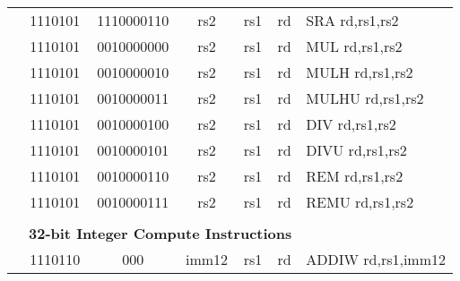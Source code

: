 \begin{table}[p]
\begin{small}
\begin{center}
\begin{tabular}{rcccccccccl}
&
\multicolumn{1}{|c|}{1110101} &
\multicolumn{5}{c|}{1110000110} &
\multicolumn{1}{c|}{rs2} &
\multicolumn{1}{c|}{rs1} &
\multicolumn{1}{c|}{rd} & SRA rd,rs1,rs2 \\
\cline{2-10}
  

&
\multicolumn{1}{|c|}{1110101} &
\multicolumn{5}{c|}{0010000000} &
\multicolumn{1}{c|}{rs2} &
\multicolumn{1}{c|}{rs1} &
\multicolumn{1}{c|}{rd} & MUL rd,rs1,rs2 \\
\cline{2-10}
  

&
\multicolumn{1}{|c|}{1110101} &
\multicolumn{5}{c|}{0010000010} &
\multicolumn{1}{c|}{rs2} &
\multicolumn{1}{c|}{rs1} &
\multicolumn{1}{c|}{rd} & MULH rd,rs1,rs2 \\
\cline{2-10}
  

&
\multicolumn{1}{|c|}{1110101} &
\multicolumn{5}{c|}{0010000011} &
\multicolumn{1}{c|}{rs2} &
\multicolumn{1}{c|}{rs1} &
\multicolumn{1}{c|}{rd} & MULHU rd,rs1,rs2 \\
\cline{2-10}
  

&
\multicolumn{1}{|c|}{1110101} &
\multicolumn{5}{c|}{0010000100} &
\multicolumn{1}{c|}{rs2} &
\multicolumn{1}{c|}{rs1} &
\multicolumn{1}{c|}{rd} & DIV rd,rs1,rs2 \\
\cline{2-10}
  

&
\multicolumn{1}{|c|}{1110101} &
\multicolumn{5}{c|}{0010000101} &
\multicolumn{1}{c|}{rs2} &
\multicolumn{1}{c|}{rs1} &
\multicolumn{1}{c|}{rd} & DIVU rd,rs1,rs2 \\
\cline{2-10}
  

&
\multicolumn{1}{|c|}{1110101} &
\multicolumn{5}{c|}{0010000110} &
\multicolumn{1}{c|}{rs2} &
\multicolumn{1}{c|}{rs1} &
\multicolumn{1}{c|}{rd} & REM rd,rs1,rs2 \\
\cline{2-10}
  

&
\multicolumn{1}{|c|}{1110101} &
\multicolumn{5}{c|}{0010000111} &
\multicolumn{1}{c|}{rs2} &
\multicolumn{1}{c|}{rs1} &
\multicolumn{1}{c|}{rd} & REMU rd,rs1,rs2 \\
\cline{2-10}
  

&
\multicolumn{9}{c}{} & \\
&
\multicolumn{9}{c}{\bf 32-bit Integer Compute Instructions} & \\
\cline{2-10}
  

&
\multicolumn{1}{|c|}{1110110} &
\multicolumn{2}{c|}{000} &
\multicolumn{4}{c|}{imm12} &
\multicolumn{1}{c|}{rs1} &
\multicolumn{1}{c|}{rd} & ADDIW rd,rs1,imm12 \\
\cline{2-10}
  


\end{tabular}
\end{center}
\end{small}
\end{table}
